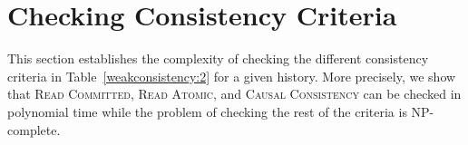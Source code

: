 \section{Checking Consistency Criteria}\label{sec:general}


This section establishes the complexity of checking the different consistency criteria in Table~\ref{weakconsistency:2} for a given history. More precisely, we show that \textsc{Read Committed}, \textsc{Read Atomic}, and \textsc{Causal Consistency} can be checked in polynomial time while the problem of checking the rest of the criteria is NP-complete. 

